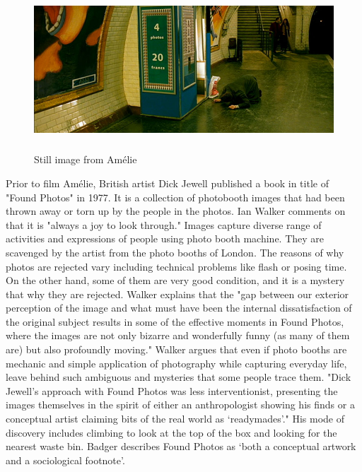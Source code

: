 \begin{figure}[h!]
  \centering
  \includegraphics[height=6cm]{graphics/amelie_01.jpg}
  \caption{Still image from Amélie}
  \label{fig:Amelie}
\end{figure}

Prior to film Amélie, British artist Dick Jewell published a book in title of "Found Photos" in 1977. It is a collection of photobooth images that had been thrown away or torn up by the people in the photos. Ian Walker comments on that it is "always a joy to look through." Images capture diverse range of activities and expressions of people using photo booth machine. They are scavenged by the artist from the photo booths of London. The reasons of why photos are rejected vary including technical problems like flash or posing time. On the other hand, some of them are very good condition, and it is a mystery that why they are rejected. Walker explains that the  "gap between our exterior perception of the image and what must have been the internal dissatisfaction of the original subject results in some of the effective moments in Found Photos, where the images are not only bizarre and wonderfully funny (as many of them are) but also profoundly moving." Walker argues that even if photo booths are mechanic and simple application of photography while capturing everyday life, leave behind such ambiguous and mysteries that some people trace them. "Dick Jewell’s approach with Found Photos was less interventionist, presenting the images themselves in the spirit of either an anthropologist showing his finds or a conceptual artist claiming bits of the real world as ‘readymades’." His mode of discovery includes climbing to look at the top of the box and looking for the nearest waste bin. Badger describes Found Photos as ‘both a conceptual artwork and a sociological footnote’.

